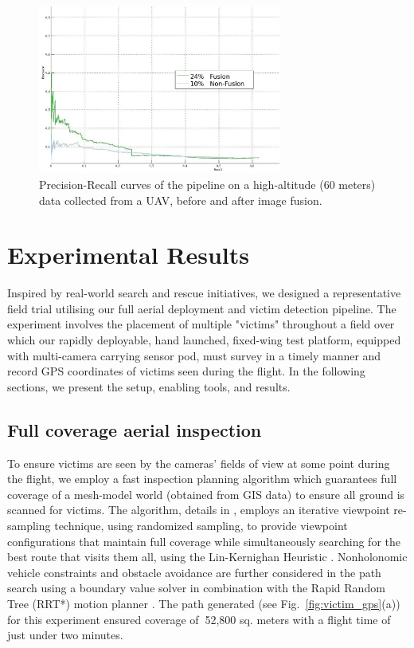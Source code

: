 \documentclass[runningheads]{llncs}
\begin{document}
\begin{figure}
  \centering
  	\includegraphics[width=8cm]{img/fusion/Roth/PR-roth-all-detections.jpg} 

  \caption{Precision-Recall curves of the pipeline on a high-altitude (60 meters) data collected from a UAV, before and after image fusion.}\label{fig:fusion}
\end{figure}


\section{Experimental Results}

Inspired by real-world search and rescue initiatives, we designed a representative field trial utilising our full aerial deployment and victim detection pipeline. The experiment involves the placement of multiple "victims" throughout a field over which our rapidly deployable, hand launched, fixed-wing test platform, equipped with multi-camera carrying sensor pod, must survey in a timely manner and record GPS coordinates of victims seen during the flight. In the following sections, we present the setup, enabling tools, and results.

\subsection{Full coverage aerial inspection}

To ensure victims are seen by the cameras' fields of view at some point during the flight, we employ a fast inspection planning algorithm which guarantees full coverage of a mesh-model world (obtained from GIS data) to ensure all ground is scanned for victims. The algorithm, details in \cite{7140101}, employs an iterative viewpoint re-sampling technique, using randomized sampling, to provide viewpoint configurations that maintain full coverage while simultaneously searching for the best route that visits them all, using the Lin-Kernighan Heuristic \cite{lin1973effective}. Nonholonomic vehicle constraints and obstacle avoidance are further considered in the path search using a boundary value solver in combination with the Rapid Random Tree (RRT*) motion planner \cite{RRTS1a}. The path generated (see Fig.~\ref{fig:victim_gps}(a)) for this experiment ensured coverage of $~$52,800 sq. meters with a flight time of just under two minutes.
\end{document}
